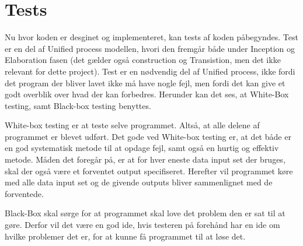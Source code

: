 \chapter{Tests}\label{ch:tests}
Nu hvor koden er desginet og implementeret, kan tests af koden påbegyndes. Test er en del af Unified process modellen, hvori den fremgår både under Inception og Elaboration fasen (det gælder også construction og Transistion, men det ikke relevant for dette project). Test er en nødvendig del af Unified process, ikke fordi det program der bliver lavet ikke må have nogle fejl, men fordi det kan give et godt overblik over hvad der kan forbedres\cite{sestoft2008systematic}. Herunder kan det ses, at White-Box testing, samt Black-box testing benyttes. 

 White-box testing er at teste selve programmet. Altså, at alle delene af programmet er blevet udført. Det gode ved White-box testing er, at det både er en god systematisk metode til at opdage fejl, samt også en hurtig og effektiv metode. Måden det foregår på, er at for hver eneste data input set der bruges, skal der også være et forventet output specifiseret. Herefter vil programmet køre med alle data input set og de givende outputs bliver sammenlignet med de forventede\cite{sestoft2008systematic}.

Black-Box skal sørge for at programmet skal love det problem den er sat til at gøre. Derfor vil det være en god ide, hvis testeren på forehånd har en ide om hvilke problemer det er, for at kunne få programmet til at løse det\cite{sestoft2008systematic}. 

